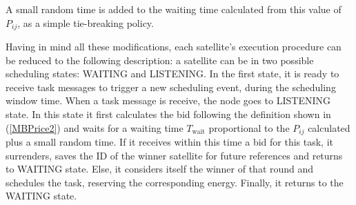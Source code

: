 A small random time is added to the waiting time calculated from this value of $P_{ij}$, as a simple tie-breaking policy.

Having in mind all these modifications, each satellite's execution procedure can be reduced to the following description: a satellite can be in two possible scheduling states: WAITING and LISTENING. In the first state, it is ready to receive task messages to trigger a new scheduling event, during the scheduling window time. When a task message is receive, the node goes to LISTENING state. In this state it first calculates the bid following the definition shown in (\ref{MBPrice2}) and waits for a waiting time $T_\text{wait}$ proportional to the $P_{ij}$ calculated plus a small random time. If it receives within this time a bid for this task, it surrenders, saves the ID of the winner satellite for future references and returns to WAITING state. Else, it considers itself the winner of that round and schedules the task, reserving the corresponding energy. Finally, it returns to the WAITING state.